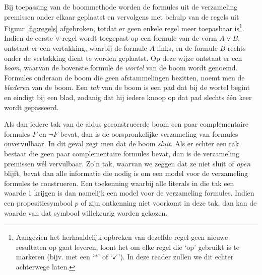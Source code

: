 Bij toepassing van de boommethode worden de formules uit de verzameling premissen onder elkaar geplaatst en vervolgens met behulp van de regels uit Figuur \ref{fig:regels} afgebroken, totdat er geen enkele regel meer toepasbaar is\footnote{Aangezien het herhaaldelijk opbreken van dezelfde regel geen nieuwe resultaten op gaat leveren, loont het om elke regel die `op' gebruikt is te markeren (bijv. met een `*' of `$\checkmark$'). In deze reader zullen we dit echter achterwege laten.}. Indien de eerste $\lor$-regel wordt toegepast op een formule van de vorm $A\lor B$, ontstaat er een vertakking, waarbij de formule $A$ links, en de formule $B$ rechts onder de vertakking dient te worden geplaatst. Op deze wijze ontstaat er een \textit{boom}, waarvan de bovenste formule de \textit{wortel} van de boom wordt genoemd. Formules onderaan de boom die geen afstammelingen bezitten, noemt men de \textit{bladeren} van de boom. Een \textit{tak} van de boom is een pad dat bij de wortel begint en eindigt bij een blad, zodanig dat hij iedere knoop op dat pad slechts \'e\'en keer wordt gepasseerd.

Als dan iedere tak van de aldus geconstrueerde boom een paar complementaire formules $F$ en $\neg F$ bevat, dan is de oorspronkelijke verzameling van formules onvervulbaar. In dit geval zegt men dat de boom \textit{sluit}. Als er echter een tak bestaat die geen paar complementaire formules bevat, dan is de verzameling premissen w\'el vervulbaar. Zo'n tak, waarvan we zeggen dat ze niet sluit of \textit{open} blijft, bevat dan alle informatie die nodig is om een model voor de verzameling formules te construeren. Een toekenning waarbij alle literals in die tak een waarde 1 krijgen is dan namelijk een model voor de verzameling formules. Indien een propositiesymbool $p$ of zijn ontkenning niet voorkomt in deze tak, dan kan de waarde van dat symbool willekeurig worden gekozen.


